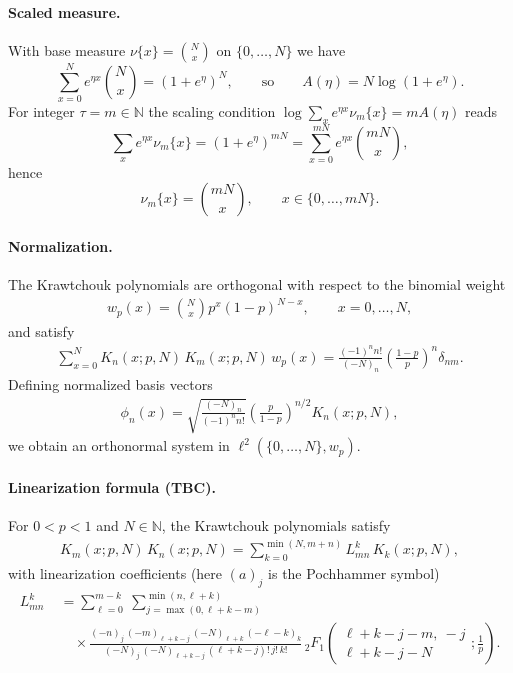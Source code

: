\documentclass[a4paper,11pt]{article}
\numberwithin{equation}{section}
\theoremstyle{plain}
\theoremstyle{definition}
\theoremstyle{remark}
\newcommand{\1}{\ensuremath{\mathds{1}}\xspace}
\begin{document}
\paragraph{Scaled measure.}
With base measure $\nu\{x\}=\binom{N}{x}$ on $\{0,\ldots,N\}$ we have
\[
\sum_{x=0}^N e^{\eta x}\binom{N}{x}=(1+e^\eta)^N,
\qquad\text{so}\qquad
A(\eta)=N\log(1+e^\eta).
\]
For integer $\tau=m\in\mathbb{N}$ the scaling condition $\log\sum_x e^{\eta x}\nu_m\{x\}=mA(\eta)$ reads
\[
\sum_x e^{\eta x}\nu_m\{x\}=(1+e^\eta)^{mN}
=\sum_{x=0}^{mN} e^{\eta x}\binom{mN}{x},
\]
hence
\[
\nu_m\{x\}=\binom{mN}{x},\qquad x\in\{0,\ldots,mN\}.
\]

\paragraph{Normalization.}
The Krawtchouk polynomials are orthogonal with respect to the binomial weight
\begin{align}
w_p(x)
=
\binom{N}{x} p^x (1-p)^{N-x},
\qquad x=0,\dots,N,
\end{align}
and satisfy
\begin{align}
\sum_{x=0}^N
K_n(x;p,N)\,K_m(x;p,N)\,w_p(x)
=
\frac{(-1)^n n!}{(-N)_n}
\left(\frac{1-p}{p}\right)^n
\delta_{nm}.
\end{align}
Defining normalized basis vectors
\begin{align}
\phi_n(x)
=
\sqrt{\frac{(-N)_n}{(-1)^n n!}}
\left(\frac{p}{1-p}\right)^{n/2}
K_n(x;p,N),
\end{align}
we obtain an orthonormal system in $\ell^2(\{0,\dots,N\},w_p)$.

\paragraph{Linearization formula (TBC).}
For $0<p<1$ and $N\in\mathbb{N}$, the Krawtchouk polynomials satisfy
\begin{align}
K_m(x;p,N)\,K_n(x;p,N)
=\sum_{k=0}^{\min(N,m+n)} L_{mn}^k\,K_k(x;p,N),
\end{align}
with linearization coefficients (here $(a)_j$ is the Pochhammer symbol)
\begin{align}
L_{mn}^k
\;&=\sum_{\ell=0}^{m-k}\ \sum_{j=\max(0,\ell+k-m)}^{\min(n,\ell+k)}
\nonumber\\
&\quad\times
\frac{(-n)_j\,(-m)_{\ell+k-j}\,(-N)_{\ell+k}\,(-\ell-k)_k}
{(-N)_j\,(-N)_{\ell+k-j}\,(\ell+k-j)!\,j!\,k!}
\,{}_2F_1\!\left(
\begin{matrix}
\ell+k-j-m,\ -j\\
\ell+k-j-N
\end{matrix}
;\frac{1}{p}\right).
\end{align}
\end{document}
